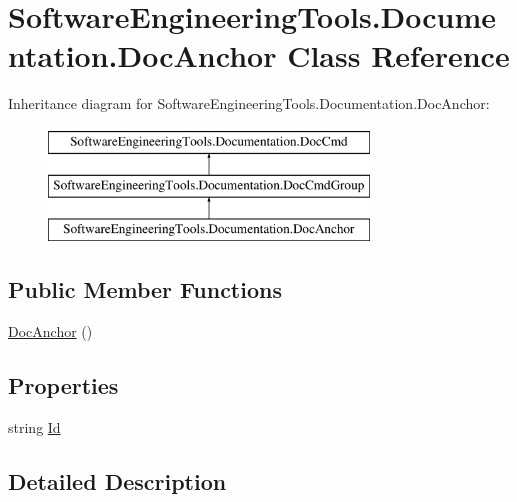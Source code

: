 \hypertarget{class_software_engineering_tools_1_1_documentation_1_1_doc_anchor}{\section{Software\+Engineering\+Tools.\+Documentation.\+Doc\+Anchor Class Reference}
\label{class_software_engineering_tools_1_1_documentation_1_1_doc_anchor}
}
Inheritance diagram for Software\+Engineering\+Tools.\+Documentation.\+Doc\+Anchor\+:\begin{figure}[H]
\begin{center}
\leavevmode
\includegraphics[height=3.000000cm]{class_software_engineering_tools_1_1_documentation_1_1_doc_anchor}
\end{center}
\end{figure}
\subsection*{Public Member Functions}
\begin{DoxyCompactItemize}
\item 
\hyperlink{class_software_engineering_tools_1_1_documentation_1_1_doc_anchor_aceb07534634cd6613fbd0dfc04d857a4}{Doc\+Anchor} ()
\end{DoxyCompactItemize}
\subsection*{Properties}
\begin{DoxyCompactItemize}
\item 
string \hyperlink{class_software_engineering_tools_1_1_documentation_1_1_doc_anchor_a8fdb6ce785bba95e544fb8a4da679395}{Id}
\end{DoxyCompactItemize}


\subsection{Detailed Description}


